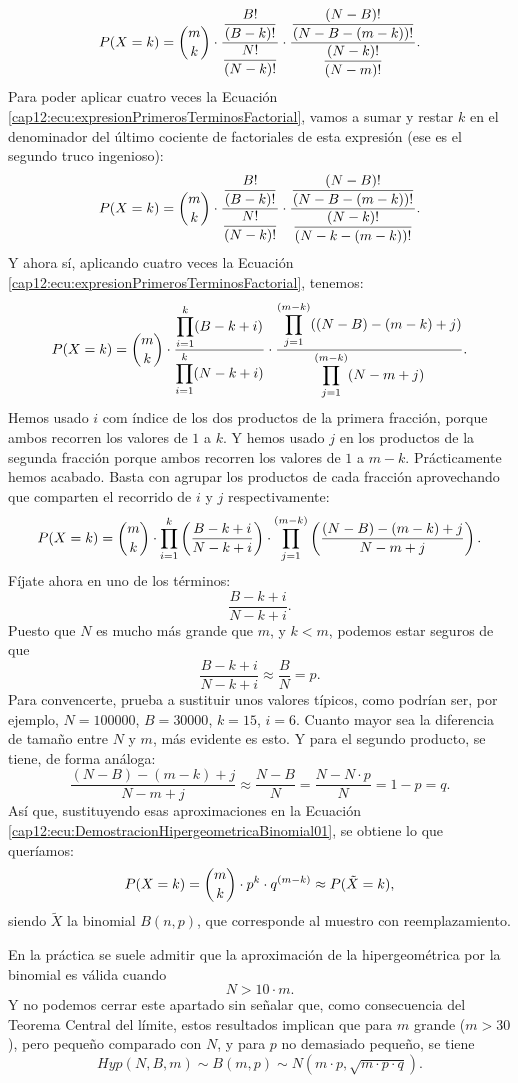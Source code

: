 \[
P(X=k)=
\dbinom{m}{k}\cdot
\frac{\dfrac{B!}{(B-k)!}}{\dfrac{N!}{(N-k)!}}\cdot\frac{\dfrac{(N-B)!}{(N-B-(m-k))!}}{\dfrac{(N-k)!}{(N-m)!}}
.
\]
Para poder aplicar cuatro veces la Ecuación \ref{cap12:ecu:expresionPrimerosTerminosFactorial}, vamos a sumar y restar $k$ en el denominador del último cociente de factoriales de esta expresión (ese es el segundo truco ingenioso):
\[
P(X=k)=
\dbinom{m}{k}\cdot
\frac{\dfrac{B!}{(B-k)!}}{\dfrac{N!}{(N-k)!}}\cdot\frac{\dfrac{(N-B)!}{(N-B-(m-k))!}}{\dfrac{(N-k)!}{(N-k-(m-k))!}}
.
\]
Y ahora sí, aplicando cuatro veces la Ecuación \ref{cap12:ecu:expresionPrimerosTerminosFactorial}, tenemos:
\[
P(X=k)=
\dbinom{m}{k}\cdot
\dfrac{\displaystyle\prod_{i=1}^k (B-k+i)}{\displaystyle\prod_{i=1}^k (N-k+i)}\cdot
\dfrac{\displaystyle\prod_{j=1}^{(m-k)} ((N-B)-(m-k)+j)}{\displaystyle\prod_{j=1}^{(m-k)}(N-m+j)}.
\]
Hemos usado $i$ com índice de los dos productos de la primera fracción, porque ambos recorren los valores de $1$ a $k$. Y hemos usado $j$ en los productos de la segunda fracción porque ambos recorren los valores de $1$ a $m-k$. Prácticamente hemos acabado. Basta con agrupar los productos de cada fracción aprovechando que comparten el recorrido de $i$ y $j$ respectivamente:
\begin{equation}
\label{cap12:ecu:DemostracionHipergeometricaBinomial01}
P(X=k)=
\dbinom{m}{k}\cdot
\displaystyle\prod_{i=1}^k\left(\dfrac{ B-k+i}{N-k+i}\right)
\cdot
\displaystyle\prod_{j=1}^{(m-k)}\left(\dfrac{(N-B)-(m-k)+j}{N-m+j}\right).
\end{equation}
Fíjate ahora en uno de los términos:
\[\dfrac{ B-k+i}{N-k+i}.\]
Puesto que $N$ es mucho más grande que $m$, y $k<m$, podemos estar seguros de que
\[\dfrac{ B-k+i}{N-k+i}\approx\dfrac{B}{N}=p.\]
Para convencerte, prueba a sustituir unos valores típicos, como podrían ser, por ejemplo,  $N=100000$, $B=30000$, $k=15$, $i=6$. Cuanto mayor sea la diferencia de tamaño entre $N$ y $m$, más evidente es esto. Y para el segundo producto, se tiene, de forma análoga:
\[\dfrac{(N-B)-(m-k)+j}{N-m+j}\approx\dfrac{N-B}{N}=\dfrac{N-N\cdot p}{N}=1-p=q.\]
Así que, sustituyendo esas aproximaciones en la Ecuación \ref{cap12:ecu:DemostracionHipergeometricaBinomial01}, se obtiene lo que queríamos:
\[
P(X=k)=\dbinom{m}{k}\cdot p^k\cdot q^{(m-k)}\approx P(\tilde X=k),
\]
siendo $\tilde X$ la binomial $B(n,p)$, que corresponde al muestro  con reemplazamiento.

En la práctica se suele admitir que la aproximación de la hipergeométrica por la binomial es válida cuando \[N > 10\cdot m.\]
Y no podemos cerrar  este apartado sin señalar que, como consecuencia del Teorema Central del límite, estos resultados implican que para $m$ grande ($m>30$), pero pequeño comparado con $N$, y para $p$ no demasiado pequeño, se tiene
\[Hyp(N,B,m)\sim B(m,p)\sim N(m\cdot p,\sqrt{m\cdot p\cdot q}).\]


